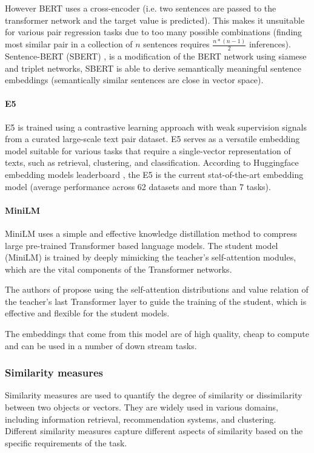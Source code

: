 \documentclass[a4paper,12pt]{article}
\begin{document}
However BERT \cite{bert} uses a cross-encoder (i.e. two sentences are passed to the transformer network and the target value is predicted). This makes it unsuitable for various pair regression tasks due to too many possible combinations (finding most similar pair in a collection of $n$ sentences requires $\frac{n*(n-1)}{2}$ inferences). Sentence-BERT (SBERT) \cite{sbert}, is a modification of the BERT network using siamese and triplet networks, SBERT is able to
derive semantically meaningful sentence embeddings (semantically similar sentences are close in vector space).

\paragraph{E5}
E5 \cite{e5} is trained using a contrastive learning approach with weak supervision signals from a curated large-scale text pair dataset. 
E5 serves as a versatile embedding model suitable for various tasks that require a single-vector representation of texts, such as retrieval, clustering, and classification. 
According to Huggingface embedding models leaderboard \cite{embedding-leaderboard}, the E5 \cite{e5} is the current stat-of-the-art embedding model (average performance across 62 datasets and more than 7 tasks).

\paragraph{MiniLM}
MiniLM \cite{minilm} uses a simple and effective knowledge distillation method to compress large pre-trained Transformer based language models. The student model (MiniLM) is trained by deeply mimicking the teacher’s self-attention \cite{attention} modules,
which are the vital components of the Transformer networks.

The authors of \cite{minilm} propose using the self-attention distributions and value
relation of the teacher’s last Transformer layer to guide the
training of the student, which is effective and flexible for the student models. 

The embeddings that come from this model are of high quality, cheap to compute and can be used in a number of down stream tasks.


\subsubsection{Similarity measures}
Similarity measures are used to quantify the degree of similarity or dissimilarity between two objects or vectors. They are widely used in various domains, including information retrieval, recommendation systems, and clustering. Different similarity measures capture different aspects of similarity based on the specific requirements of the task.
\end{document}
